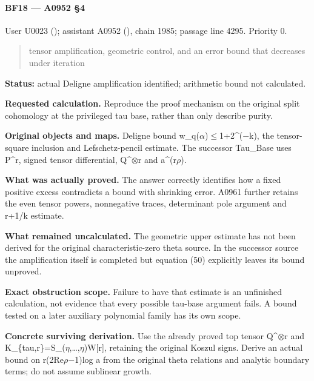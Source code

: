 \paragraph{BF18 --- A0952 §4}\label{bf18-a0952-4}

User U0023 (\protect{});
assistant A0952 (\protect{}),
chain 1985; passage line 4295. Priority 0.

\begin{quote}
tensor amplification, geometric control, and an error bound that
decreases under iteration
\end{quote}

\textbf{Status:} actual Deligne amplification identified; arithmetic
bound not calculated.

\textbf{Requested calculation.} Reproduce the proof mechanism on the
original split cohomology at the privileged tau base, rather than only
describe purity.

\textbf{Original objects and maps.} Deligne bound
w\_q(\allowbreak{}\ensuremath{α}\allowbreak{})\allowbreak{}\ensuremath{≤}\allowbreak{}1+2\textasciicircum{}(\allowbreak{}\ensuremath{−}\allowbreak{}k),
the tensor-square inclusion and Lefschetz-pencil estimate. The successor
Tau\_Base uses P\^{}r, signed tensor differential,
Q\textasciicircum{}\allowbreak{}\ensuremath{⊗}\allowbreak{}r and
a\textasciicircum{}(r\allowbreak{}\ensuremath{ρ}\allowbreak{}).

\textbf{What was actually proved.} The answer correctly identifies how a
fixed positive excess contradicts a bound with shrinking error. A0961
further retains the even tensor powers, nonnegative traces, determinant
pole argument and r+1/k estimate.

\textbf{What remained uncalculated.} The geometric upper estimate has
not been derived for the original characteristic-zero theta source. In
the successor source the amplification itself is completed but equation
(50) explicitly leaves its bound unproved.

\textbf{Exact obstruction scope.} Failure to have that estimate is an
unfinished calculation, not evidence that every possible tau-base
argument fails. A bound tested on a later auxiliary polynomial family
has its own scope.

\textbf{Concrete surviving derivation.} Use the already proved top
tensor Q\textasciicircum{}\allowbreak{}\ensuremath{⊗}\allowbreak{}r and
K\_\{tau,r\}=S\_(\allowbreak{}\ensuremath{η}\allowbreak{},…,\allowbreak{}\ensuremath{η}\allowbreak{})W[r],
retaining the original Koszul signs. Derive an actual bound on
r(2Re\allowbreak{}\ensuremath{ρ}\allowbreak{}\allowbreak{}\ensuremath{−}\allowbreak{}1)log
a from the original theta relations and analytic boundary terms; do not
assume sublinear growth.

